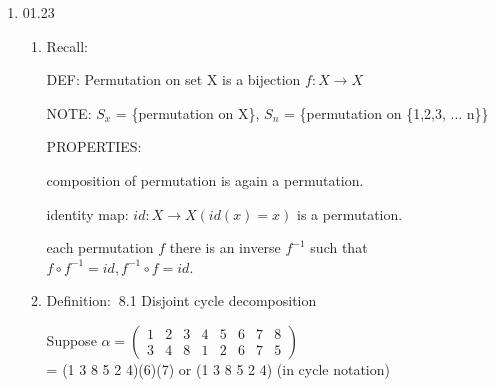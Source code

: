 \documentclass[12pt]{article}
\newcommand{\defi}{{\color{blue} Definition: $\ $}}
\newcommand{\recall}{{\color{blue} Recall: $\ $}}
\newcommand{\Z}{\mathbf{Z}}
\begin{document}
\begin{enumerate}
\begin{enumerate}
\begin{proof}
        Let $[x]_8 = [x']_8 \\ \Rightarrow x \equiv x' (mod \ 8) \\ \Rightarrow 8|(x - x') \\ \Rightarrow x - x' = 8*q $ for some $q \in \Z$ \\
        $x = 8\cdot q + x'$

        By definition of $g$, $g([x]_8) = [6x]_{12}$\\
        Then, $g([x]_8) = [6(8q+x')]_{12} = [48q + 6x']_{12}, g([x']_8) = [6x']_{12}$\\
        WTS $[48q + 6x']_{12} = [6x']_{12}$\\
        Enough to show: $12 | (48q + 6x' - 6x')$\\
        Since $48q + 6x' - 6x' = 48 q = 12 \cdot 4 \cdot q$\\
        $\Rightarrow 12 | 12 \cdot 4 \cdot q$\\
        $\Rightarrow 12 | (48q + 6x' - 6x')$ \\
        $\Rightarrow g([x]_8) = g([x']_8)$
        \end{proof}
    \end{enumerate}
    \item 01.23
    \begin{enumerate}
        \item \recall
    
        DEF: Permutation on set X is a bijection $f: X \rightarrow X$

        NOTE: $S_x$ = \{permutation on X\}, $S_n$ = \{permutation on \{1,2,3, ... n\}\}

        PROPERTIES: 
        
        composition of permutation is again a permutation.

        identity map: $id: X \rightarrow X (id(x) = x)$ is a permutation.

        each permutation $f$ there is an inverse $f^{-1}$ such that $f \circ f^{-1} = id, f^{-1} \circ f = id$.

    \item \defi 8.1 Disjoint cycle decomposition
    
    Suppose $\alpha = \begin{pmatrix}
        1 & 2 & 3 & 4 & 5 & 6 & 7 & 8 \\
        3 & 4 & 8 & 1 & 2 & 6 & 7 & 5
    \end{pmatrix}$ \\= (1 3 8 5 2 4)(6)(7) or (1 3 8 5 2 4) (in cycle notation)
    

\end{enumerate}
\end{enumerate}
\end{document}
